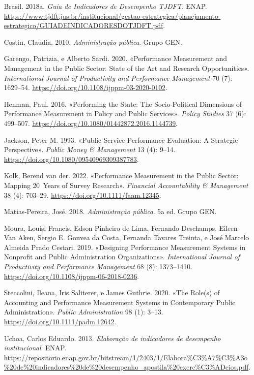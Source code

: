 \documentclass[
  letterpaper,
  DIV=11,
  numbers=noendperiod]{scrreprt}
\newlength{\cslhangindent}
\newlength{\cslentryspacingunit} %
\newenvironment{CSLReferences}[2] %
 {%
  \setlength{\parindent}{0pt}
  \ifodd #1
  \let\oldpar\par
  \def\par{\hangindent=\cslhangindent\oldpar}
  \fi
  \setlength{\parskip}{#2\cslentryspacingunit}
 }%
 {}
\begin{document}
\hypertarget{refs}{}
\begin{CSLReferences}{1}{0}
\leavevmode{}%
Brasil. 2018a. \emph{Guia de Indicadores de Desempenho TJDFT}. ENAP.
\url{https://www.tjdft.jus.br/institucional/gestao-estrategica/planejamento-estrategico/GUIADEINDICADORESDOTJDFT.pdf}.

\leavevmode{}%
Costin, Claudia. 2010. \emph{Administração pública}. Grupo GEN.

\leavevmode{}%
Garengo, Patrizia, e Alberto Sardi. 2020. {«Performance Measurement and
Management in the Public Sector: State of the Art and Research
Opportunities»}. \emph{International Journal of Productivity and
Performance Management} 70 (7): 1629--54.
\url{https://doi.org/10.1108/ijppm-03-2020-0102}.

\leavevmode{}%
Henman, Paul. 2016. {«Performing the State: The Socio-Political
Dimensions of Performance Measurement in Policy and Public Services»}.
\emph{Policy Studies} 37 (6): 499--507.
\url{https://doi.org/10.1080/01442872.2016.1144739}.

\leavevmode{}%
Jackson, Peter M. 1993. {«Public Service Performance Evaluation: A
Strategic Perspective»}. \emph{Public Money \& Management} 13 (4):
9--14. \url{https://doi.org/10.1080/09540969309387783}.

\leavevmode{}%
Kolk, Berend van der. 2022. {«Performance Measurement in the Public
Sector: Mapping 20~Years of Survey Research»}. \emph{Financial
Accountability \& Management} 38 (4): 703--29.
\url{https://doi.org/10.1111/faam.12345}.

\leavevmode{}%
Matias-Pereira, José. 2018. \emph{Administração pública}. 5a ed. Grupo
GEN.

\leavevmode{}%
Moura, Louisi Francis, Edson Pinheiro de Lima, Fernando Deschamps,
Eileen Van Aken, Sergio E. Gouvea da Costa, Fernanda Tavares Treinta, e
José Marcelo Almeida Prado Cestari. 2019. {«Designing Performance
Measurement Systems in Nonprofit and Public Administration
Organizations»}. \emph{International Journal of Productivity and
Performance Management} 68 (8): 1373--1410.
\url{https://doi.org/10.1108/ijppm-06-2018-0236}.

\leavevmode{}%
Steccolini, Ileana, Iris Saliterer, e James Guthrie. 2020. {«The Role(s)
of Accounting and Performance Measurement Systems in Contemporary Public
Administration»}. \emph{Public Administration} 98 (1): 3--13.
\url{https://doi.org/10.1111/padm.12642}.

\leavevmode{}%
Uchoa, Carlos Eduardo. 2013. \emph{Elaboração de indicadores de
desempenho institucional}. ENAP.
\url{https://repositorio.enap.gov.br/bitstream/1/2403/1/Elabora\%C3\%A7\%C3\%A3o\%20de\%20indicadores\%20de\%20desempenho_apostila\%20exerc\%C3\%ADcios.pdf}.

\end{CSLReferences}
\end{document}
